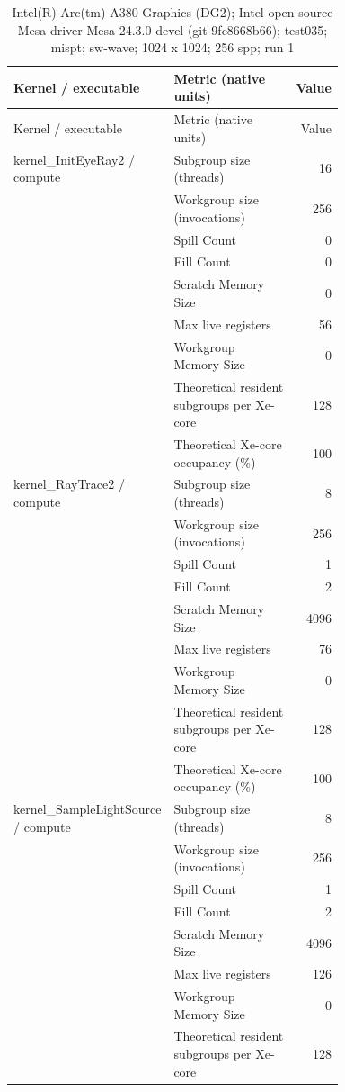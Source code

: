 \begin{longtable}{p{0.30\linewidth}p{0.43\linewidth}r}
\caption{Intel(R) Arc(tm) A380 Graphics (DG2); Intel open-source Mesa driver Mesa 24.3.0-devel (git-9fc8668b66); test035; mispt; sw-wave; 1024 x 1024; 256 spp; run 1}\label{tab:hydra-profile-4}\\
\hline Kernel / executable & Metric (native units) & Value \\\hline
\endfirsthead
\hline Kernel / executable & Metric (native units) & Value \\\hline
\endhead
kernel\_InitEyeRay2 / compute & Subgroup size (threads) & 16 \\
 & Workgroup size (invocations) & 256 \\
 & Spill Count & 0 \\
 & Fill Count & 0 \\
 & Scratch Memory Size & 0 \\
 & Max live registers & 56 \\
 & Workgroup Memory Size & 0 \\
 & Theoretical resident subgroups per Xe-core & 128 \\
 & Theoretical Xe-core occupancy (\%) & 100 \\
\hline
kernel\_RayTrace2 / compute & Subgroup size (threads) & 8 \\
 & Workgroup size (invocations) & 256 \\
 & Spill Count & 1 \\
 & Fill Count & 2 \\
 & Scratch Memory Size & 4096 \\
 & Max live registers & 76 \\
 & Workgroup Memory Size & 0 \\
 & Theoretical resident subgroups per Xe-core & 128 \\
 & Theoretical Xe-core occupancy (\%) & 100 \\
\hline
kernel\_SampleLightSource / compute & Subgroup size (threads) & 8 \\
 & Workgroup size (invocations) & 256 \\
 & Spill Count & 1 \\
 & Fill Count & 2 \\
 & Scratch Memory Size & 4096 \\
 & Max live registers & 126 \\
 & Workgroup Memory Size & 0 \\
 & Theoretical resident subgroups per Xe-core & 128 \\

\end{longtable}
